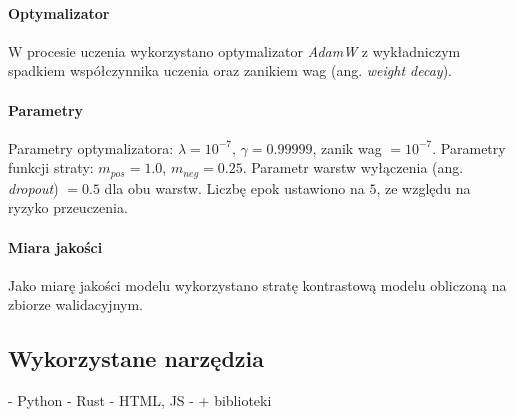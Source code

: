                     \paragraph{Optymalizator}
                    
                        W procesie uczenia wykorzystano optymalizator \textit{AdamW} \cite{Loshchilov2017DecoupledWD} z wykładniczym spadkiem współczynnika uczenia oraz zanikiem wag (ang. \textit{weight decay}).
                
                    \paragraph{Parametry}
    
                         Parametry optymalizatora: $\lambda = 10^{-7}$, $\gamma = 0.99999$, zanik wag $= 10^{-7}$.  Parametry funkcji straty: $m_{pos} = 1.0$, $m_{neg} = 0.25$. Parametr warstw wyłączenia (ang. \textit{dropout}) $= 0.5$ dla obu warstw. Liczbę epok ustawiono na $5$, ze względu na ryzyko przeuczenia.
    
    
                    \paragraph{Miara jakości}
                    
                        Jako miarę jakości modelu wykorzystano stratę kontrastową modelu obliczoną na zbiorze walidacyjnym.

    \subsection{Wykorzystane narzędzia}
    - Python
    - Rust
    - HTML, JS 
    - + biblioteki